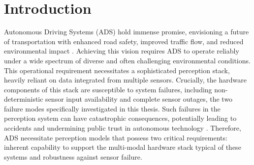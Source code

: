 \section{Introduction} \label{Introduction}


Autonomous Driving Systems (ADS) hold immense promise, envisioning a future of transportation with enhanced road safety, improved traffic flow, and reduced environmental impact \cite{litmanAutonomousVehicleImplementationb}. Achieving this vision requires ADS to operate reliably under a wide spectrum of diverse and often challenging environmental conditions. This operational requirement necessitates a sophisticated perception stack, heavily reliant on data integrated from multiple sensors. Crucially, the hardware components of this stack are susceptible to system failures, including non-deterministic sensor input availability and complete sensor outages, the two failure modes specifically investigated in this thesis. Such failures in the perception system can have catastrophic consequences, potentially leading to accidents and undermining public trust in autonomous technology \cite{}. Therefore, ADS necessitate perception models that possess two critical requirements: inherent capability to support the multi-modal hardware stack typical of these systems and robustness against sensor failure.

